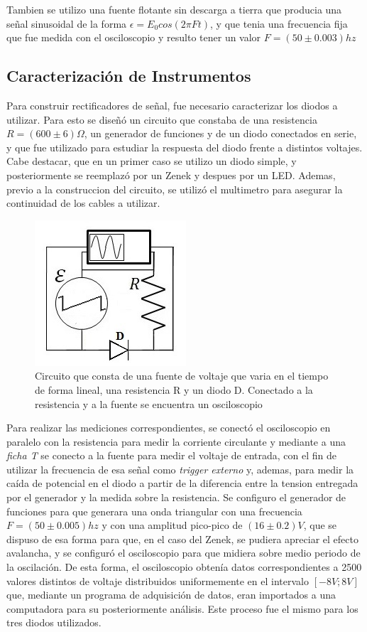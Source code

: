 \documentclass[11pt,a4paper]{article}
\begin{document}
Tambien se utilizo una fuente flotante sin descarga a tierra que producia una señal sinusoidal de la forma $\epsilon = E_{0}cos(2\pi Ft)$, y que tenia una frecuencia fija que fue medida con el osciloscopio y resulto tener un valor $F = (50 \pm 0.003)hz$


\subsection{Caracterización de Instrumentos}
Para construir rectificadores de señal, fue necesario caracterizar los diodos a utilizar. Para esto se diseñó un circuito que constaba de una resistencia \textbf{$R = (600 \pm 6)\Omega$}, un generador de funciones y de un diodo conectados en serie, y que fue utilizado para estudiar la respuesta del diodo frente a distintos voltajes. Cabe destacar, que en un primer caso se utilizo un diodo simple, y posteriormente se reemplazó por un Zenek y despues por un LED. Ademas, previo a la construccion del circuito, se utilizó el multimetro para asegurar la continuidad de los cables a utilizar.

\begin{figure}[H]
\centering
\includegraphics[scale=0.8]{Caracterizar-Diodo}
   \caption{Circuito que consta de una fuente de voltaje que varia en el tiempo de forma lineal, una resistencia R y un diodo D. Conectado a la resistencia y a la fuente se encuentra un osciloscopio}
   \label{fig:Car-Dio}
\end{figure}

Para realizar las mediciones correspondientes, se conectó el osciloscopio en paralelo con la resistencia para medir la corriente circulante y mediante a una \textit{ficha T} se conecto a la fuente para medir el voltaje de entrada, con el fin de utilizar la frecuencia de esa señal como \textit{trigger externo} y, ademas, para medir la caída de potencial en el diodo a partir de la diferencia entre la tension entregada por el generador y la medida sobre la resistencia. Se configuro el generador de funciones para que generara una onda triangular con una frecuencia  $F = (50 \pm 0.005)hz$ y con una amplitud pico-pico de $(16 \pm 0.2)V$, que se dispuso de esa forma para que, en el caso del Zenek, se pudiera apreciar el efecto avalancha, y se configuró el osciloscopio para que midiera sobre medio periodo de la oscilación. De esta forma, el osciloscopio obtenía datos correspondientes a 2500 valores distintos de voltaje distribuidos uniformemente en el intervalo $[-8V;8V]$ que, mediante un programa de adquisición de datos, eran importados a una computadora para su posteriormente análisis. Este proceso fue el mismo para los tres diodos utilizados.
\end{document}

